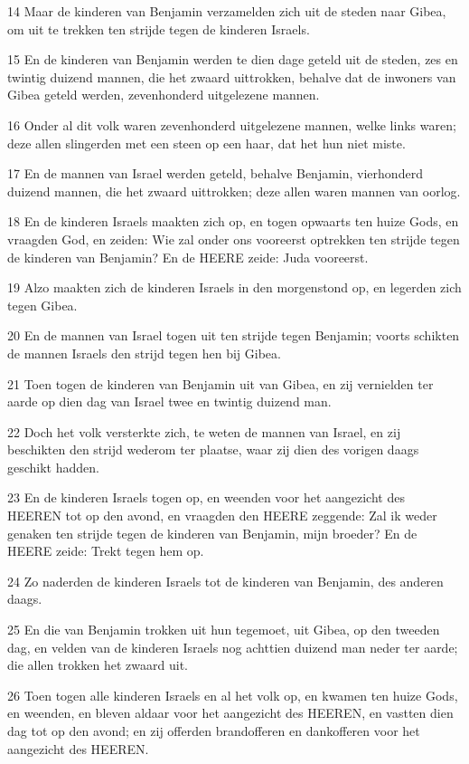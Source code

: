 \par 14 Maar de kinderen van Benjamin verzamelden zich uit de steden naar Gibea, om uit te trekken ten strijde tegen de kinderen Israels.
\par 15 En de kinderen van Benjamin werden te dien dage geteld uit de steden, zes en twintig duizend mannen, die het zwaard uittrokken, behalve dat de inwoners van Gibea geteld werden, zevenhonderd uitgelezene mannen.
\par 16 Onder al dit volk waren zevenhonderd uitgelezene mannen, welke links waren; deze allen slingerden met een steen op een haar, dat het hun niet miste.
\par 17 En de mannen van Israel werden geteld, behalve Benjamin, vierhonderd duizend mannen, die het zwaard uittrokken; deze allen waren mannen van oorlog.
\par 18 En de kinderen Israels maakten zich op, en togen opwaarts ten huize Gods, en vraagden God, en zeiden: Wie zal onder ons vooreerst optrekken ten strijde tegen de kinderen van Benjamin? En de HEERE zeide: Juda vooreerst.
\par 19 Alzo maakten zich de kinderen Israels in den morgenstond op, en legerden zich tegen Gibea.
\par 20 En de mannen van Israel togen uit ten strijde tegen Benjamin; voorts schikten de mannen Israels den strijd tegen hen bij Gibea.
\par 21 Toen togen de kinderen van Benjamin uit van Gibea, en zij vernielden ter aarde op dien dag van Israel twee en twintig duizend man.
\par 22 Doch het volk versterkte zich, te weten de mannen van Israel, en zij beschikten den strijd wederom ter plaatse, waar zij dien des vorigen daags geschikt hadden.
\par 23 En de kinderen Israels togen op, en weenden voor het aangezicht des HEEREN tot op den avond, en vraagden den HEERE zeggende: Zal ik weder genaken ten strijde tegen de kinderen van Benjamin, mijn broeder? En de HEERE zeide: Trekt tegen hem op.
\par 24 Zo naderden de kinderen Israels tot de kinderen van Benjamin, des anderen daags.
\par 25 En die van Benjamin trokken uit hun tegemoet, uit Gibea, op den tweeden dag, en velden van de kinderen Israels nog achttien duizend man neder ter aarde; die allen trokken het zwaard uit.
\par 26 Toen togen alle kinderen Israels en al het volk op, en kwamen ten huize Gods, en weenden, en bleven aldaar voor het aangezicht des HEEREN, en vastten dien dag tot op den avond; en zij offerden brandofferen en dankofferen voor het aangezicht des HEEREN.
